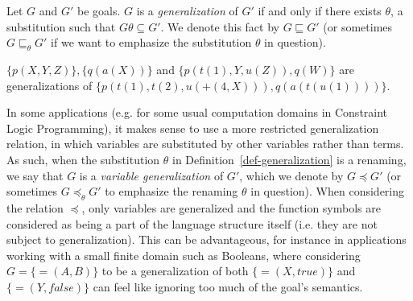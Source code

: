 \begin{definition}%
	\label{def-generalization}
	Let $G$ and $G'$ be goals. $G$ is a \emph{generalization} of $G'$ if and only if there exists $\theta$, a substitution such that $G\theta \subseteq G'$. We denote this fact by $G\sqsubseteq G'$ (or sometimes $G\sqsubseteq_\theta G'$ if we want to emphasize the substitution $\theta$ in question).
\end{definition}

\begin{example}
	$\{p(X,Y,Z)\}, \{q(a(X))\}$ and $\{p(t(1), Y, u(Z)), q(W)\}$ are generalizations of $\{p(t(1), t(2), u(+(4,X))), q(a(t(u(1))))\}$.
\end{example} 

In some applications (e.g. for some usual computation domains in Constraint Logic Programming), it makes sense to use a more restricted generalization relation, in which variables are substituted by other variables rather than terms. As such, when the substitution $\theta$ in Definition~\ref{def-generalization} is a renaming, we say that $G$ is a \textit{variable generalization} of $G'$, which we denote by $G\preceq G'$ (or sometimes $G\preceq_\theta G'$ to emphasize the renaming $\theta$ in question). When considering the relation $\preceq$, only variables are generalized and the function symbols are considered as being a part of the language structure itself (i.e. they are not subject to generalization). This can be advantageous, for instance in applications working with a small finite domain such as Booleans, where considering $G = \{=\!\!(A,B)\}$ to be a generalization of both $\{=\!\!(X, true)\}$ and $\{=\!\!(Y, false)\}$ can feel like ignoring too much of the goal's semantics.
%


